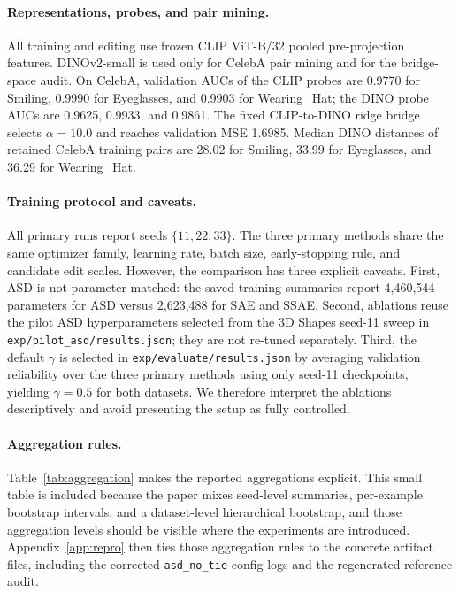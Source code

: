 \documentclass{article}
\begin{document}
\paragraph{Representations, probes, and pair mining.}
All training and editing use frozen CLIP ViT-B/32 pooled pre-projection features. DINOv2-small is used only for CelebA pair mining and for the bridge-space audit. On CelebA, validation AUCs of the CLIP probes are 0.9770 for Smiling, 0.9990 for Eyeglasses, and 0.9903 for Wearing\_Hat; the DINO probe AUCs are 0.9625, 0.9933, and 0.9861. The fixed CLIP-to-DINO ridge bridge selects $\alpha=10.0$ and reaches validation MSE 1.6985. Median DINO distances of retained CelebA training pairs are 28.02 for Smiling, 33.99 for Eyeglasses, and 36.29 for Wearing\_Hat.

\paragraph{Training protocol and caveats.}
All primary runs report seeds $\{11,22,33\}$. The three primary methods share the same optimizer family, learning rate, batch size, early-stopping rule, and candidate edit scales. However, the comparison has three explicit caveats. First, ASD is not parameter matched: the saved training summaries report 4,460,544 parameters for ASD versus 2,623,488 for SAE and SSAE. Second, ablations reuse the pilot ASD hyperparameters selected from the 3D Shapes seed-11 sweep in \texttt{exp/pilot\_asd/results.json}; they are not re-tuned separately. Third, the default $\gamma$ is selected in \texttt{exp/evaluate/results.json} by averaging validation reliability over the three primary methods using only seed-11 checkpoints, yielding $\gamma=0.5$ for both datasets. We therefore interpret the ablations descriptively and avoid presenting the setup as fully controlled.

\paragraph{Aggregation rules.}
Table~\ref{tab:aggregation} makes the reported aggregations explicit. This small table is included because the paper mixes seed-level summaries, per-example bootstrap intervals, and a dataset-level hierarchical bootstrap, and those aggregation levels should be visible where the experiments are introduced.
Appendix~\ref{app:repro} then ties those aggregation rules to the concrete artifact files, including the corrected \texttt{asd\_no\_tie} config logs and the regenerated reference audit.
\end{document}
